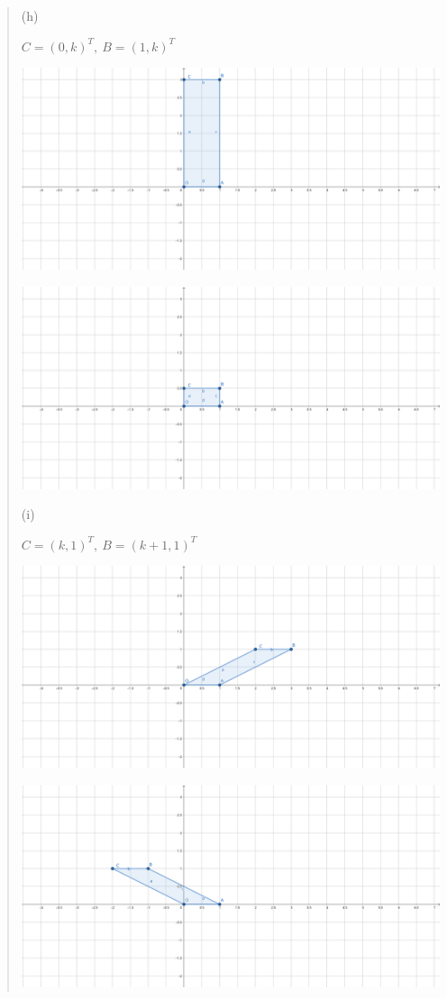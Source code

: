 \documentclass{article}
\begin{document}
\begin{quote}
    (h)
    
    $C = (0, k)^T, \ B = (1, k)^T$
    
        \includegraphics[width=0.75\linewidth]{geogebra-export(8).png}

            \includegraphics[width=0.75\linewidth]{geogebra-export(9).png}

    (i)

    $C = (k, 1)^T, \ B = (k + 1, 1)^T$
    
        \includegraphics[width=0.75\linewidth]{geogebra-export(10).png}

            \includegraphics[width=0.75\linewidth]{geogebra-export(11).png}


\end{quote}
\end{document}
